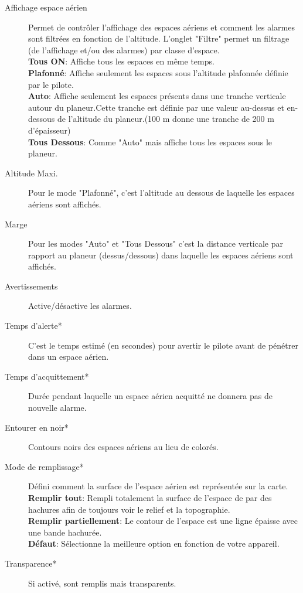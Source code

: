 \begin{description}
\item[Affichage espace aérien]  Permet de contrôler l'affichage des espaces aériens et comment les alarmes sont filtrées en fonction de l'altitude. L'onglet "Filtre" permet un filtrage (de l'affichage et/ou des alarmes) par classe d'espace. \\
  {\bf Tous ON}: Affiche tous les espaces en même temps. \\
  {\bf Plafonné}: Affiche seulement les espaces sous l'altitude plafonnée définie par le pilote.\\
  {\bf Auto}: Affiche seulement les espaces présents dans une tranche verticale autour du planeur.Cette tranche est définie par une valeur au-dessus et en-dessous de l'altitude du planeur.(100 m donne une tranche de 200 m d'épaisseur)\\
  {\bf Tous Dessous}:  Comme "Auto" mais affiche tous les espaces sous le planeur.
\item[Altitude Maxi.] Pour le mode "Plafonné", c'est l'altitude au dessous de laquelle les espaces aériens sont affichés.
\item[Marge]  Pour les modes "Auto" et "Tous Dessous" c'est la distance verticale par rapport au planeur (dessus/dessous) dans laquelle les espaces aériens sont affichés.
\item[Avertissements]  Active/désactive les alarmes.
\item[Temps d'alerte*]  C'est le temps estimé (en secondes) pour avertir le pilote avant de pénétrer dans un espace aérien.
\item[Temps d'acquittement*]  Durée pendant laquelle un espace aérien acquitté ne donnera pas de nouvelle alarme.
\item[Entourer en noir*]  Contours noirs des espaces aériens au lieu de colorés.
\item[Mode de remplissage*]  Défini comment la surface de l'espace aérien est représentée sur la carte.\\
  {\bf Remplir tout}: Rempli totalement la surface de l'espace de par des hachures afin de toujours voir le relief et la topographie.\\
  {\bf Remplir partiellement}: Le contour de l'espace est une ligne épaisse avec une bande hachurée. \\
  {\bf Défaut}:  Sélectionne la meilleure option en fonction de votre appareil. 
\item[Transparence*]  Si activé, sont remplis mais transparents.
\end{description}

